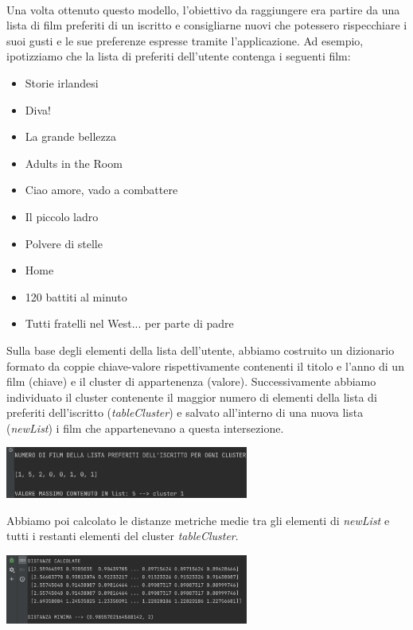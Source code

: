 \documentclass[a4paper, 10pt]{report}
\begin{document}
        \\Una volta ottenuto questo modello, l'obiettivo da raggiungere era partire da una lista di film preferiti di un iscritto
        e consigliarne nuovi che potessero rispecchiare i suoi gusti e le sue preferenze espresse tramite l'applicazione.
        Ad esempio, ipotizziamo che la lista di preferiti dell'utente contenga i seguenti film:
        \begin{itemize}
            \item Storie irlandesi
            \item Diva!
            \item La grande bellezza
            \item Adults in the Room
            \item Ciao amore, vado a combattere
            \item Il piccolo ladro
            \item Polvere di stelle
            \item Home
            \item 120 battiti al minuto
            \item Tutti fratelli nel West... per parte di padre
        \end{itemize}
        Sulla base degli elementi della lista dell'utente, abbiamo costruito un dizionario formato da
        coppie chiave-valore rispettivamente contenenti il titolo e l'anno di un film (chiave) e il cluster di appartenenza (valore).
        Successivamente abbiamo individuato il cluster contenente il maggior numero di elementi della lista di preferiti dell'iscritto
        (\textit{tableCluster}) e salvato all'interno di una nuova lista (\textit{newList}) i film che appartenevano a questa intersezione.
        \begin{center}
            \includegraphics[width=8cm]{modelling/numeroFilmxCluster}\\
        \end{center}

        Abbiamo poi calcolato le distanze metriche medie tra gli elementi di \textit{newList} e tutti i restanti elementi
        del cluster \textit{tableCluster}.
        \begin{center}
            \includegraphics[width=8cm]{modelling/distanzeMetriche}\\
        \end{center}
\end{document}
